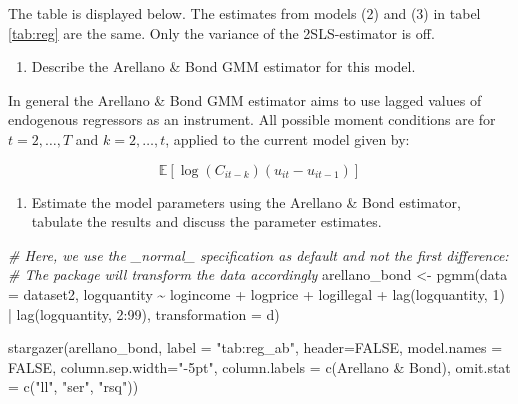 \documentclass[
]{article}
\newenvironment{Shaded}{\begin{snugshade}}{\end{snugshade}}
\newcommand{\AttributeTok}[1]{\textcolor[rgb]{0.77,0.63,0.00}{#1}}
\newcommand{\CommentTok}[1]{\textcolor[rgb]{0.56,0.35,0.01}{\textit{#1}}}
\newcommand{\ConstantTok}[1]{\textcolor[rgb]{0.00,0.00,0.00}{#1}}
\newcommand{\DecValTok}[1]{\textcolor[rgb]{0.00,0.00,0.81}{#1}}
\newcommand{\FunctionTok}[1]{\textcolor[rgb]{0.00,0.00,0.00}{#1}}
\newcommand{\NormalTok}[1]{#1}
\newcommand{\OtherTok}[1]{\textcolor[rgb]{0.56,0.35,0.01}{#1}}
\newcommand{\SpecialCharTok}[1]{\textcolor[rgb]{0.00,0.00,0.00}{#1}}
\newcommand{\StringTok}[1]{\textcolor[rgb]{0.31,0.60,0.02}{#1}}
\providecommand{\tightlist}{%
  \setlength{\itemsep}{0pt}\setlength{\parskip}{0pt}}
\let\oldShaded\Shaded
\let\endoldShaded\endShaded
\renewenvironment{Shaded}{\footnotesize\oldShaded}{\endoldShaded}
\begin{document}
The table is displayed below. The estimates from models (2) and (3) in
tabel \ref{tab:reg} are the same. Only the variance of the
2SLS-estimator is off.

\begin{enumerate}
\def\labelenumi{\arabic{enumi}.}
\setcounter{enumi}{3}
\tightlist
\item
  Describe the Arellano \& Bond GMM estimator for this model.
\end{enumerate}

In general the Arellano \& Bond GMM estimator aims to use lagged values
of endogenous regressors as an instrument. All possible moment
conditions are for \(t=2,\dots,T\) and \(k=2,\dots,t\), applied to the
current model given by:

\begin{equation*}
\mathbb{E}[\log(C_{it-k})(u_{it}-u_{it-1})]
\end{equation*}

\begin{enumerate}
\def\labelenumi{\arabic{enumi}.}
\setcounter{enumi}{4}
\tightlist
\item
  Estimate the model parameters using the Arellano \& Bond estimator,
  tabulate the results and discuss the parameter estimates.
\end{enumerate}

\begin{Shaded}
\begin{Highlighting}[]
\CommentTok{\# Here, we use the \_normal\_ specification as default and not the first difference:}
\CommentTok{\# The package will transform the data accordingly}
\NormalTok{arellano\_bond }\OtherTok{\textless{}{-}} \FunctionTok{pgmm}\NormalTok{(}\AttributeTok{data =}\NormalTok{ dataset2,}
\NormalTok{                          logquantity }\SpecialCharTok{\textasciitilde{}}\NormalTok{ logincome }\SpecialCharTok{+}\NormalTok{ logprice }\SpecialCharTok{+} 
\NormalTok{                            logillegal }\SpecialCharTok{+} \FunctionTok{lag}\NormalTok{(logquantity, }\DecValTok{1}\NormalTok{)}
                          \SpecialCharTok{|} \FunctionTok{lag}\NormalTok{(logquantity, }\DecValTok{2}\SpecialCharTok{:}\DecValTok{99}\NormalTok{), }\AttributeTok{transformation =} \StringTok{\textquotesingle{}d\textquotesingle{}}\NormalTok{)}

\FunctionTok{stargazer}\NormalTok{(arellano\_bond, }\AttributeTok{label =} \StringTok{"tab:reg\_ab"}\NormalTok{, }\AttributeTok{header=}\ConstantTok{FALSE}\NormalTok{, }\AttributeTok{model.names =} \ConstantTok{FALSE}\NormalTok{,}
          \AttributeTok{column.sep.width=}\StringTok{"{-}5pt"}\NormalTok{,}
          \AttributeTok{column.labels =} \FunctionTok{c}\NormalTok{(}\StringTok{\textquotesingle{}Arellano \& Bond\textquotesingle{}}\NormalTok{),}
              \AttributeTok{omit.stat =} \FunctionTok{c}\NormalTok{(}\StringTok{"ll"}\NormalTok{, }\StringTok{"ser"}\NormalTok{, }\StringTok{"rsq"}\NormalTok{))}
\end{Highlighting}
\end{Shaded}
\end{document}
